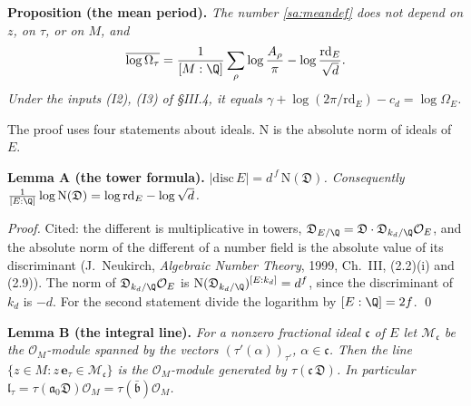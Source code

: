 \documentclass[11pt,letterpaper]{article}
\begin{document}
\textbf{Proposition (the mean period).} \emph{The number \eqref{sa:meandef} does not depend on $z$, on
$\tau$, or on $M$, and}
\begin{equation}\label{D:287}
 \overline{\log\Omega_\tau}=\frac1{[M:\Q]}\sum_\rho\log\frac{A_\rho}{\pi}-\log\frac{\mathrm{rd}_E}{\sqrt d}.
\end{equation}
\emph{Under the inputs \textup{(I2)}, \textup{(I3)} of \S III.4, it equals
$\gamma+\log(2\pi/\mathrm{rd}_E)-c_d=\log\Omega_E$.}

The proof uses four statements about ideals. $\mathrm N$ is the absolute norm of ideals of $E$.

\textbf{Lemma A (the tower formula).} \emph{$|\mathrm{disc}\,E|=d^{\,f}\,\mathrm N(\mathfrak D)$.
Consequently $\frac1{[E:\Q]}\log\mathrm N(\mathfrak D)=\log\mathrm{rd}_E-\log\sqrt d$.}

\emph{Proof.} Cited: the different is multiplicative in towers,
$\mathfrak D_{E/\Q}=\mathfrak D\cdot\mathfrak D_{k_d/\Q}\mathcal O_E$, and the absolute norm of the
different of a number field is the absolute value of its discriminant (J.~Neukirch, \emph{Algebraic Number
Theory}, 1999, Ch.~III, (2.2)(i) and (2.9)). The norm of $\mathfrak D_{k_d/\Q}\mathcal O_E$ is
$\mathrm N(\mathfrak D_{k_d/\Q})^{[E:k_d]}=d^{f}$, since the discriminant of $k_d$ is $-d$. For the
second statement divide the logarithm by $[E:\Q]=2f$. \qed

\textbf{Lemma B (the integral line).} \emph{For a nonzero fractional ideal $\mathfrak c$ of $E$ let
$\mathcal M_{\mathfrak c}$ be the $\mathcal O_M$-module spanned by the vectors
$(\tau'(\alpha))_{\tau'}$, $\alpha\in\mathfrak c$. Then the line
$\{z\in M: z\,\mathbf e_\tau\in\mathcal M_{\mathfrak c}\}$ is the $\mathcal O_M$-module generated by
$\tau(\mathfrak c\,\mathfrak D)$. In particular
$\mathfrak l_\tau=\tau(\mathfrak a_0\mathfrak D)\mathcal O_M=\tau(\bar{\mathfrak b})\mathcal O_M$.}
\end{document}
